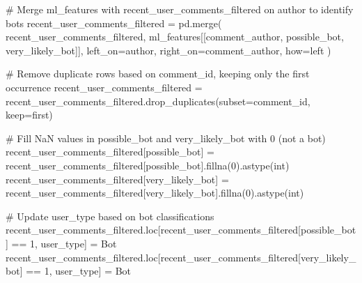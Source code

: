 \documentclass[
  12pt,
  letterpaper,
  DIV=11,
  numbers=noendperiod]{scrartcl}
\newenvironment{Shaded}{\begin{snugshade}}{\end{snugshade}}
\newcommand{\BuiltInTok}[1]{\textcolor[rgb]{0.00,0.23,0.31}{#1}}
\newcommand{\CommentTok}[1]{\textcolor[rgb]{0.37,0.37,0.37}{#1}}
\newcommand{\DecValTok}[1]{\textcolor[rgb]{0.68,0.00,0.00}{#1}}
\newcommand{\NormalTok}[1]{\textcolor[rgb]{0.00,0.23,0.31}{#1}}
\newcommand{\OperatorTok}[1]{\textcolor[rgb]{0.37,0.37,0.37}{#1}}
\newcommand{\StringTok}[1]{\textcolor[rgb]{0.13,0.47,0.30}{#1}}
\begin{document}
\begin{Shaded}
\begin{Highlighting}[]
\CommentTok{\# Merge ml\_features with recent\_user\_comments\_filtered on \textquotesingle{}author\textquotesingle{} to identify bots}
\NormalTok{recent\_user\_comments\_filtered }\OperatorTok{=}\NormalTok{ pd.merge(}
\NormalTok{    recent\_user\_comments\_filtered,}
\NormalTok{    ml\_features[[}\StringTok{\textquotesingle{}comment\_author\textquotesingle{}}\NormalTok{, }\StringTok{\textquotesingle{}possible\_bot\textquotesingle{}}\NormalTok{, }\StringTok{\textquotesingle{}very\_likely\_bot\textquotesingle{}}\NormalTok{]],}
\NormalTok{    left\_on}\OperatorTok{=}\StringTok{\textquotesingle{}author\textquotesingle{}}\NormalTok{,}
\NormalTok{    right\_on}\OperatorTok{=}\StringTok{\textquotesingle{}comment\_author\textquotesingle{}}\NormalTok{,}
\NormalTok{    how}\OperatorTok{=}\StringTok{\textquotesingle{}left\textquotesingle{}}
\NormalTok{)}

\CommentTok{\# Remove duplicate rows based on \textquotesingle{}comment\_id\textquotesingle{}, keeping only the first occurrence}
\NormalTok{recent\_user\_comments\_filtered }\OperatorTok{=}\NormalTok{ recent\_user\_comments\_filtered.drop\_duplicates(subset}\OperatorTok{=}\StringTok{\textquotesingle{}comment\_id\textquotesingle{}}\NormalTok{, keep}\OperatorTok{=}\StringTok{\textquotesingle{}first\textquotesingle{}}\NormalTok{)}

\CommentTok{\# Fill NaN values in \textquotesingle{}possible\_bot\textquotesingle{} and \textquotesingle{}very\_likely\_bot\textquotesingle{} with 0 (not a bot)}
\NormalTok{recent\_user\_comments\_filtered[}\StringTok{\textquotesingle{}possible\_bot\textquotesingle{}}\NormalTok{] }\OperatorTok{=}\NormalTok{ recent\_user\_comments\_filtered[}\StringTok{\textquotesingle{}possible\_bot\textquotesingle{}}\NormalTok{].fillna(}\DecValTok{0}\NormalTok{).astype(}\BuiltInTok{int}\NormalTok{)}
\NormalTok{recent\_user\_comments\_filtered[}\StringTok{\textquotesingle{}very\_likely\_bot\textquotesingle{}}\NormalTok{] }\OperatorTok{=}\NormalTok{ recent\_user\_comments\_filtered[}\StringTok{\textquotesingle{}very\_likely\_bot\textquotesingle{}}\NormalTok{].fillna(}\DecValTok{0}\NormalTok{).astype(}\BuiltInTok{int}\NormalTok{)}

\CommentTok{\# Update \textquotesingle{}user\_type\textquotesingle{} based on bot classifications}
\NormalTok{recent\_user\_comments\_filtered.loc[recent\_user\_comments\_filtered[}\StringTok{\textquotesingle{}possible\_bot\textquotesingle{}}\NormalTok{] }\OperatorTok{==} \DecValTok{1}\NormalTok{, }\StringTok{\textquotesingle{}user\_type\textquotesingle{}}\NormalTok{] }\OperatorTok{=} \StringTok{\textquotesingle{}Bot\textquotesingle{}}
\NormalTok{recent\_user\_comments\_filtered.loc[recent\_user\_comments\_filtered[}\StringTok{\textquotesingle{}very\_likely\_bot\textquotesingle{}}\NormalTok{] }\OperatorTok{==} \DecValTok{1}\NormalTok{, }\StringTok{\textquotesingle{}user\_type\textquotesingle{}}\NormalTok{] }\OperatorTok{=} \StringTok{\textquotesingle{}Bot\textquotesingle{}}


\end{Highlighting}
\end{Shaded}
\end{document}

